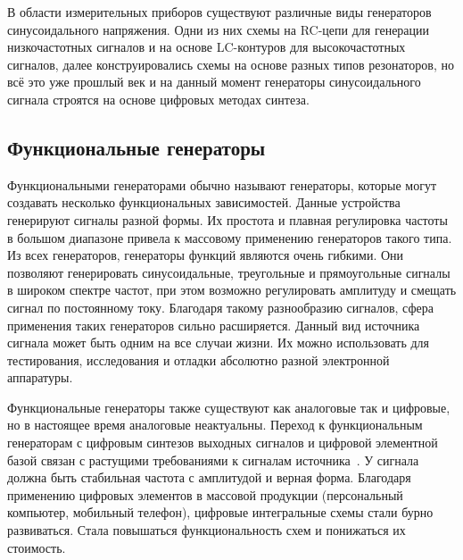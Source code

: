 	В области измерительных приборов существуют различные виды генераторов синусоидального напряжения. Одни из них схемы на RC-цепи для генерации низкочастотных сигналов и на основе LC-контуров для высокочастотных сигналов, далее конструировались схемы на основе разных типов резонаторов, но всё это уже прошлый век и на данный момент генераторы синусоидального сигнала строятся на основе цифровых методах синтеза.



\subsection{Функциональные генераторы}
	Функциональными генераторами обычно называют генераторы, которые могут создавать несколько функциональных зависимостей. Данные устройства генерируют сигналы разной формы. Их простота и плавная регулировка частоты в большом диапазоне привела к массовому применению генераторов такого типа. Из всех генераторов, генераторы функций являются очень гибкими. Они позволяют генерировать синусоидальные, треугольные и прямоугольные сигналы в широком спектре частот, при этом возможно регулировать амплитуду и смещать сигнал по постоянному току. Благодаря такому разнообразию сигналов, сфера применения таких генераторов сильно расширяется. Данный вид источника сигнала может быть одним на все случаи жизни. Их можно использовать для тестирования, исследования и отладки абсолютно разной электронной аппаратуры.

	Функциональные генераторы также существуют как аналоговые так и цифровые, но в настоящее время аналоговые неактуальны. Переход к функциональным генераторам с цифровым синтезов выходных сигналов и цифровой элементной базой связан с растущими требованиями к сигналам источника~\cite{dgs}. У сигнала должна быть стабильная частота с амплитудой и верная форма. Благодаря применению цифровых элементов в массовой продукции (персональный компьютер, мобильный телефон), цифровые интегральные схемы стали бурно развиваться. Стала повышаться функциональность схем и понижаться их стоимость.

